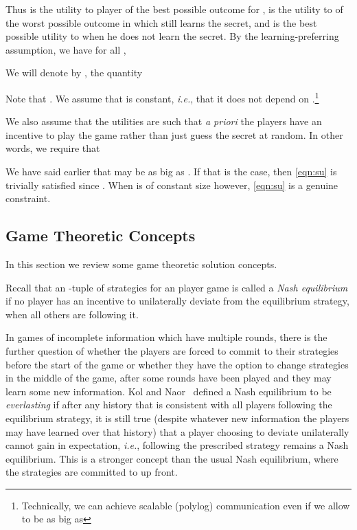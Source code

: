 \documentclass[12pt]{article}
\theoremstyle{definition}
\newcommand{\ie}{\emph{i.e.}}
\begin{document}
Thus  is the utility to player  of the best possible outcome 
for ,  is the utility to  of the worst possible outcome in 
which  still learns the secret, and  is the best possible 
utility to  when he does not learn the secret. By the learning-preferring 
assumption, we have for all ,

We will denote by , the quantity
 
Note that . We assume that  is constant, \ie, that it does 
not depend on .\footnote{Technically, we can achieve scalable (polylog)
communication even if we allow  to be as big as }

We also assume that the utilities are such that \emph{a priori} the players 
have an incentive to play the game rather than just guess the secret at 
random. In other words, we require that 

We have said earlier that  may be as big as .  If that is the case, 
then \eqref{eqn:su} is trivially satisfied since . When  is of 
constant size however, \eqref{eqn:su} is a genuine constraint. 


\subsection{Game Theoretic Concepts}
In this section we review some game theoretic solution concepts.


Recall that an -tuple of strategies for an  player game is called 
a \emph{Nash equilibrium} if no player has an incentive to unilaterally deviate 
from the equilibrium strategy, when all others are following it. 



In games of incomplete information which have multiple rounds, there is 
the further question of whether the players are forced to commit to their 
strategies before the start of the game or whether they have the option to 
change strategies in the middle of the game, after some rounds have been 
played and they may learn some new information. Kol and 
Naor~\cite{kol2008games} defined a Nash equilibrium to be 
\emph{everlasting} if after any history that is consistent with all 
players following the equilibrium strategy, it is still true (despite 
whatever new information the players may have learned over that history) 
that a player choosing to deviate unilaterally cannot gain in expectation, 
\ie, following the prescribed strategy remains a Nash equilibrium. 
This is a stronger concept than the usual Nash equilibrium, where 
the strategies are committed to up front.
\end{document}
